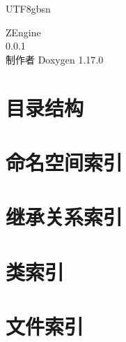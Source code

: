 \documentclass[twoside]{book}
\newcommand{\+}{\discretionary{\mbox{\scriptsize$\hookleftarrow$}}{}{}}
\newcommand{\clearemptydoublepage}{%
    \newpage{\pagestyle{empty}\cleardoublepage}%
  }
\begin{document}
  \raggedbottom
  \begin{CJK}{UTF8}{gbsn}
    \hypersetup{pageanchor=false,
                bookmarksnumbered=true,
                pdfencoding=unicode
               }
  \begin{titlepage}
  \vspace*{7cm}
  \begin{center}%
  {\Large ZEngine}\\
  [1ex]\large 0.\+0.\+1 \\
  \vspace*{1cm}
  {\large 制作者 Doxygen 1.17.0}\\
  \end{center}
  \end{titlepage}
  \clearemptydoublepage
  \tableofcontents
  \clearemptydoublepage
  \hypersetup{pageanchor=true}



\chapter{目录结构}

\chapter{命名空间索引}

\chapter{继承关系索引}

\chapter{类索引}

\chapter{文件索引}


\end{CJK}
\end{document}
